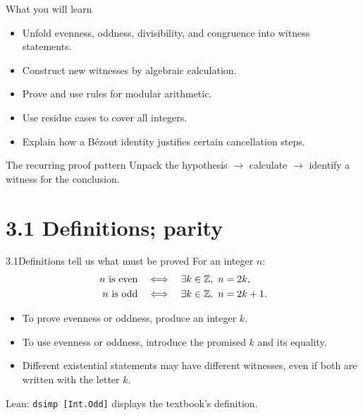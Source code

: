 


\begin{frame}\titlepage\end{frame}

\begin{frame}{What you will learn}
\begin{itemize}
\item Unfold evenness, oddness, divisibility, and congruence into witness statements.
\item Construct new witnesses by algebraic calculation.
\item Prove and use rules for modular arithmetic.
\item Use residue cases to cover all integers.
\item Explain how a B\'ezout identity justifies certain cancellation steps.
\end{itemize}
\begin{block}{The recurring proof pattern}
Unpack the hypothesis $\longrightarrow$ calculate $\longrightarrow$ identify a witness for the conclusion.
\end{block}
\end{frame}

\section{3.1 Definitions; parity}
\begin{frame}{3.1\quad Definitions tell us what must be proved}
For an integer $n$:
\begin{align*}
n\text{ is even}&\quad\Longleftrightarrow\quad \exists k\in\Z,\ n=2k,\\
n\text{ is odd}&\quad\Longleftrightarrow\quad \exists k\in\Z,\ n=2k+1.
\end{align*}
\begin{itemize}
\item To prove evenness or oddness, produce an integer $k$.
\item To use evenness or oddness, introduce the promised $k$ and its equality.
\item Different existential statements may have different witnesses, even if both are written with the letter $k$.
\end{itemize}
Lean: \texttt{dsimp [Int.Odd]} displays the textbook's definition.
\end{frame}


